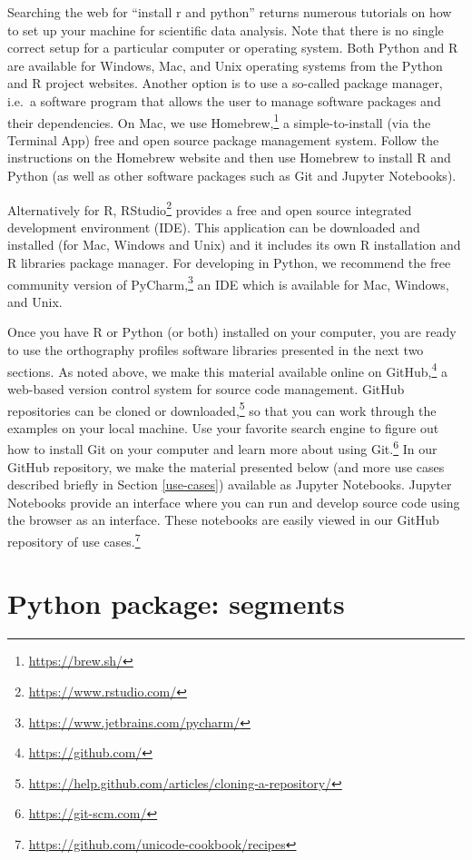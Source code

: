 \documentclass[output=book,nonflat,modfonts,
citecolor=brown,
		]{langsci/langscibook}\usepackage[]{graphicx}\usepackage[]{color}
\begin{document}
Searching the web for ``install r and python'' returns numerous tutorials on how to set up your machine for scientific data analysis. Note that there is no single correct setup for a particular computer or operating system. Both Python and R are available for Windows, Mac, and Unix operating systems from the Python and R project websites. Another option is to use a so-called package manager, i.e.\ a software program that allows the user to manage software packages and their dependencies. On Mac, we use Homebrew,\footnote{\url{https://brew.sh/}} a simple-to-install (via the Terminal App) free and open source package management system. Follow the instructions on the Homebrew website and then use Homebrew to install R and Python (as well as other software packages such as Git and Jupyter Notebooks). 

Alternatively for R, RStudio\footnote{\url{https://www.rstudio.com/}} provides a free and open source integrated development environment (IDE). This application can be downloaded and installed (for Mac, Windows and Unix) and it includes its own R installation and R libraries package manager. For developing in Python, we recommend the free community version of PyCharm,\footnote{\url{https://www.jetbrains.com/pycharm/}} an IDE which is available for Mac, Windows, and Unix. 

Once you have R or Python (or both) installed on your computer, you are ready to use the orthography profiles software libraries presented in the next two sections. As noted above, we make this material available online on GitHub,\footnote{\url{https://github.com/}} a web-based version control system for source code management. GitHub repositories can be cloned or downloaded,\footnote{\url{https://help.github.com/articles/cloning-a-repository/}} so that you can work through the examples on your local machine. Use your favorite search engine to figure out how to install Git on your computer and learn more about using Git.\footnote{\url{https://git-scm.com/}} In our GitHub repository, we make the material presented below (and more use cases described briefly in Section \ref{use-cases}) available as Jupyter Notebooks. Jupyter Notebooks provide an interface where you can run and develop source code using the browser as an interface. These notebooks are easily viewed in our GitHub repository of use cases.\footnote{\url{https://github.com/unicode-cookbook/recipes}}



\section{Python package: segments}
\label{python-implementations}
\end{document}

